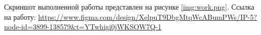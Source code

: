 \documentclass{bsuir}
\begin{document}
\maketitle
\mainmatter

Скриншот выполненной работы представлен на рисунке \ref{img:work.png}.
Ссылка на работу:
\url{https://www.figma.com/design/XelpuT9DbgMtqWcABumPWs/IP-5?node-id=3899-138579&t=YTwhigi0jWKSOW7Q-1}

\end{document}
